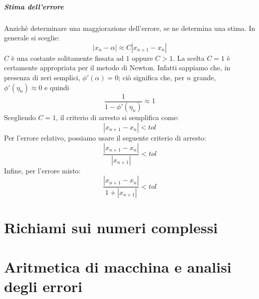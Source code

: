 \documentclass[12pt]{report}
\begin{document}
\paragraph{Stima dell'errore} Anzichè determinare una maggiorazione dell'errore, se ne determina una stima. In generale si sceglie:
\[
|x_n - \alpha| \approx C|x_{n+1}-x_n|
\]
$C$ è una costante solitamente fissata ad $1$ oppure $C > 1$. La scelta $C = 1$ è certamente appropriata per il metodo di Newton. Infatti sappiamo che, in presenza di zeri semplici, $\phi'(\alpha) = 0$; ciò significa che, per $n$ grande, $\phi'(\eta_n) \approx 0$ e quindi
\[
\frac{1}{1 - \phi'(\eta_n)} \approx 1
\]
Scegliendo $C = 1$, il criterio di arresto si semplifica come:
\[
|x_{n+1}-x_n|  < tol
\]
Per l'errore relativo, possiamo usare il seguente criterio di arresto:
\[
\frac{|x_{n+1}-x_n|}{|x_{n+1}|} < tol
\]
Infine, per l'errore misto:
\[
\frac{|x_{n+1}-x_n|}{1 + |x_{n+1}|} < tol
\]
\chapter{Richiami sui numeri complessi}
\chapter{Aritmetica di macchina e analisi degli errori}
\end{document}
